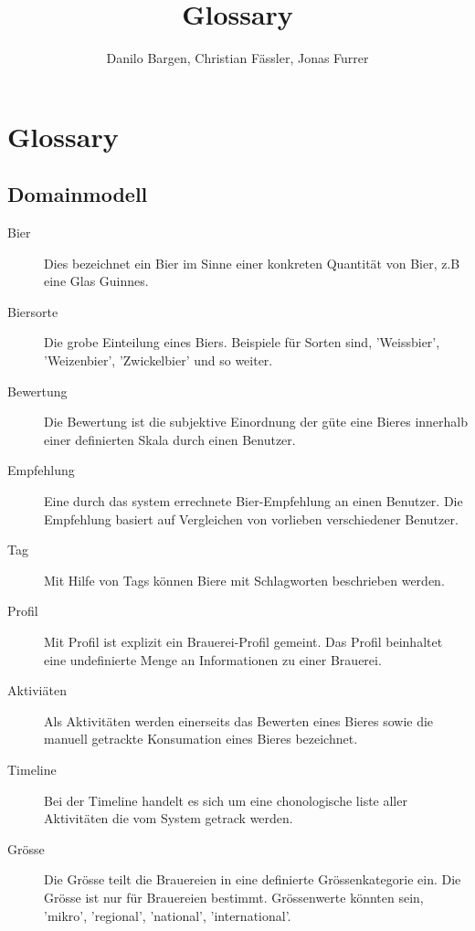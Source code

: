 \documentclass[10pt,a4paper]{scrartcl}
\author{Danilo Bargen, Christian Fässler, Jonas Furrer}
\title{Glossary}
\begin{document}
\begin{titlepage}
	\maketitle
	\vspace{120mm}
	\thispagestyle{empty} %
\end{titlepage}



\section{Glossary}
\subsection{Domainmodell}
\begin{description}
	\item[Bier] Dies bezeichnet ein Bier im Sinne einer konkreten Quantität von Bier, z.B eine Glas Guinnes. 
	\item[Biersorte] Die grobe Einteilung eines Biers. Beispiele für Sorten sind, 'Weissbier', 'Weizenbier', 'Zwickelbier' und so weiter.
	\item[Bewertung] Die Bewertung ist die subjektive Einordnung der güte eine Bieres innerhalb einer definierten Skala durch einen Benutzer.
	\item[Empfehlung] Eine durch das system errechnete Bier-Empfehlung an einen Benutzer. Die Empfehlung basiert auf Vergleichen von vorlieben verschiedener Benutzer.
	\item[Tag] Mit Hilfe von Tags können Biere mit Schlagworten beschrieben werden.
	\item[Profil] Mit Profil ist explizit ein Brauerei-Profil gemeint. Das Profil beinhaltet eine undefinierte Menge an Informationen zu einer Brauerei.
	\item[Aktiviäten] Als Aktivitäten werden einerseits das Bewerten eines Bieres sowie die manuell getrackte Konsumation eines Bieres bezeichnet. 
	\item[Timeline] Bei der Timeline handelt es sich um eine chonologische liste aller Aktivitäten die vom System getrack werden.
	\item[Grösse] Die Grösse teilt die Brauereien in eine definierte Grössenkategorie ein. Die Grösse ist nur für Brauereien bestimmt. Grössenwerte könnten sein, 'mikro', 'regional', 'national', 'international'.
\end{description}
\end{document}
